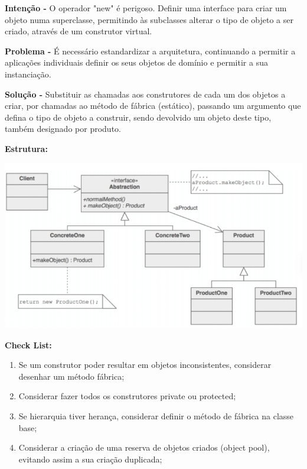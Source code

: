 \documentclass{article}
\begin{document}
\begin{flushleft}
    \textbf{Intenção -} O operador "new" é perigoso. Definir uma interface para criar
    um objeto numa superclasse, permitindo às subclasses alterar o tipo de objeto
    a ser criado, através de um construtor virtual.
\end{flushleft}

\begin{flushleft}
    \textbf{Problema -} É necessário estandardizar a arquitetura, continuando a permitir a aplicações
    individuais definir os seus objetos de domínio e permitir a sua instanciação.
\end{flushleft}

\begin{flushleft}
    \textbf{Solução -} Substituir as chamadas aos construtores de cada um dos objetos a criar, por
    chamadas ao método de fábrica (estático), passando um argumento que defina o
    tipo de objeto a construir, sendo devolvido um objeto deste tipo, também designado
    por produto.
\end{flushleft}

\begin{flushleft}
    \textbf{Estrutura:}

    \begin{center}
        \includegraphics[scale=0.4]{Images/24.png}
    \end{center}
\end{flushleft}

\pagebreak

\begin{flushleft}
    \textbf{Check List:}

    \begin{enumerate}
        \item Se um construtor poder resultar em objetos inconsistentes, considerar
        desenhar um método fábrica;
        \item  Considerar fazer todos os construtores private ou protected;
        \item Se hierarquia tiver herança, considerar definir o método de fábrica na classe
        base;
        \item Considerar a criação de uma reserva de objetos criados (object pool), evitando assim a sua
        criação duplicada;
    \end{enumerate}


\end{flushleft}
\end{document}
